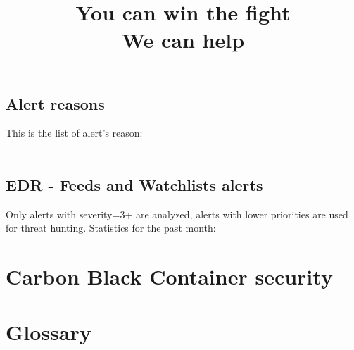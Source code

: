 \documentclass[12pt,letterpaper]{report}
\begin{document}
\section{Alert reasons}
This is the list of alert's reason:\\
\\

\section{EDR - Feeds and Watchlists alerts}
Only alerts with severity=3+ are analyzed, alerts with lower priorities are used for threat hunting.
\vskip10pt
Statistics for the past month:\\


\chapter{Carbon Black Container security}


%

%

\chapter{Glossary}

\printglossaries

\newpage
\thispagestyle{empty}
\bannercbcontainer
\vspace{2cm}
\title{You can win the fight\\We can help}

\logocbcontainer
\end{document}
